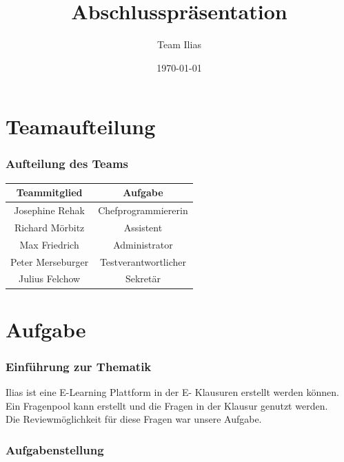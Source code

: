 \documentclass{beamer}
\title{Abschlusspräsentation}
\author{Team Ilias}
\date{\today}
\begin{document}
	\maketitle
	\frame{\tableofcontents[]}

	\section{Teamaufteilung}
	\begin{frame}
		\frametitle{Aufteilung des Teams}
		\begin{tabular}{|c|c|}\hline
			Teammitglied & Aufgabe \\\hline
			Josephine Rehak & Chefprogrammiererin\\\hline
			Richard Mörbitz & Assistent\\\hline
			Max Friedrich & Administrator\\\hline
			Peter Merseburger & Testverantwortlicher\\\hline
			Julius Felchow & Sekretär\\\hline
		\end{tabular}
	\end{frame} 
 
	\section{Aufgabe}
		\begin{frame}
			\frametitle{Einführung zur Thematik}
  			Ilias ist eine E-Learning Plattform in der E-					Klausuren erstellt werden können. Ein Fragenpool 				kann erstellt und die Fragen in der Klausur 					genutzt werden.\\
  			\pause
    		Die Reviewmöglichkeit für diese Fragen war unsere 				Aufgabe.
		\end{frame}
		\begin{frame}
			\frametitle{Aufgabenstellung}
			
		\end{frame}
\end{document}
